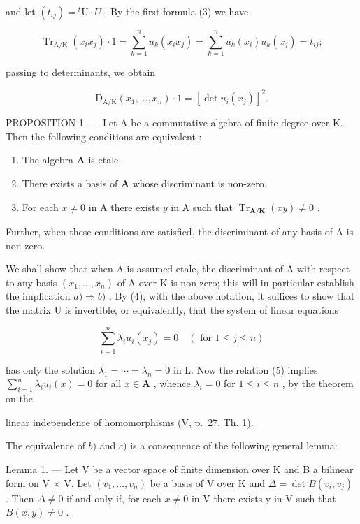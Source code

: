 and let \((t_{ij}) = {}^t\mathrm{U} \cdot U\) . By the first formula (3) we have

\[
\operatorname{Tr} _ {\mathrm{A} / \mathrm{K}} \left(x _ {i} x _ {j}\right) \cdot 1 = \sum_ {k = 1} ^ {n} u _ {k} \left(x _ {i} x _ {j}\right) = \sum_ {k = 1} ^ {n} u _ {k} \left(x _ {i}\right) u _ {k} \left(x _ {j}\right) = t _ {i j};
\]

passing to determinants, we obtain

\[
\mathrm{D} _ {\mathrm{A} / \mathrm{K}} (x _ {1}, \dots , x _ {n}) \cdot 1 = [ \det u _ {i} (x _ {j}) ] ^ {2}.\tag{4}
\]

PROPOSITION 1. --- Let A be a commutative algebra of finite degree over K. Then the following conditions are equivalent :

\begin{enumerate}
\def\labelenumi{\alph{enumi})}
\item
  The algebra \(\mathbf{A}\) is etale.
\item
  There exists a basis of \(\mathbf{A}\) whose discriminant is non-zero.
\item
  For each \(x \neq 0\) in A there exists \(y\) in A such that \(\operatorname{Tr}_{\mathbf{A} / \mathbf{K}}(xy) \neq 0\) .
\end{enumerate}

Further, when these conditions are satisfied, the discriminant of any basis of A is non-zero.

We shall show that when A is assumed etale, the discriminant of A with respect to any basis \((x_{1},\ldots,x_{n})\) of A over K is non-zero; this will in particular establish the implication \(a)\Rightarrow b)\) . By (4), with the above notation, it suffices to show that the matrix U is invertible, or equivalently, that the system of linear equations

\[
\sum_ {i = 1} ^ {n} \lambda_ {i} u _ {i} (x _ {j}) = 0 \quad (\text { for } 1 \leqslant j \leqslant n)\tag{5}
\]

has only the solution \(\lambda_{1} = \cdots = \lambda_{n} = 0\) in L. Now the relation (5) implies \(\sum_{i=1}^{n} \lambda_{i} u_{i}(x) = 0\) for all \(x \in \mathbf{A}\) , whence \(\lambda_{i} = 0\) for \(1 \leqslant i \leqslant n\) , by the theorem on the

linear independence of homomorphisms (V, p.~27, Th. 1).

The equivalence of \(b)\) and \(c)\) is a consequence of the following general lemma:

Lemma 1. --- Let V be a vector space of finite dimension over K and B a bilinear form on V × V. Let \((v_{1}, \ldots, v_{n})\) be a basis of V over K and \(\Delta = \det B(v_{i}, v_{j})\) . Then \(\Delta \neq 0\) if and only if, for each \(x \neq 0\) in V there exists y in V such that \(B(x, y) \neq 0\) .

